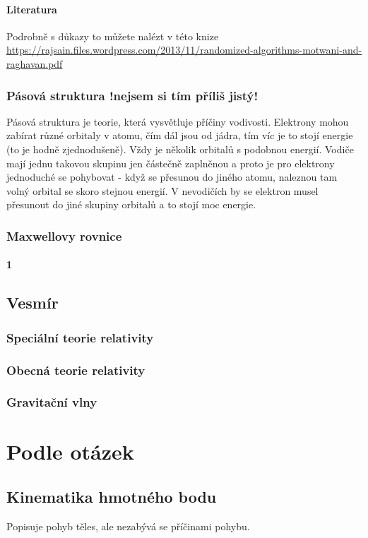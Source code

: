 \documentclass[titlepage]{book}
\begin{document}
\subsection{Literatura}
Podrobně s důkazy to můžete nalézt v této knize \\ \url{https://rajsain.files.wordpress.com/2013/11/randomized-algorithms-motwani-and-raghavan.pdf}
\section{Pásová struktura !nejsem si tím příliš jistý!}\label{sec:band}
Pásová struktura je teorie, která vysvětluje příčiny vodivosti. Elektrony mohou zabírat různé orbitaly v atomu, čím dál jsou od jádra, tím víc je to stojí energie (to je hodně zjednodušeně). Vždy je několik orbitalů s podobnou energií. Vodiče mají jednu takovou skupinu jen částečně zaplněnou a proto je pro elektrony jednoduché se pohybovat - když se přesunou do jiného atomu, naleznou tam volný orbital se skoro stejnou energií. V nevodičích by se elektron musel přesunout do jiné skupiny orbitalů a to stojí moc energie.
\section{Maxwellovy rovnice}
\subsection{1}
\chapter{Vesmír}
\section{Speciální teorie relativity}
\section{Obecná teorie relativity}
\section{Gravitační vlny}

\part{Podle otázek}
\setcounter{chapter}{0}

\chapter{Kinematika hmotného bodu}
Popisuje pohyb těles, ale nezabývá se příčinami pohybu.
\end{document}
